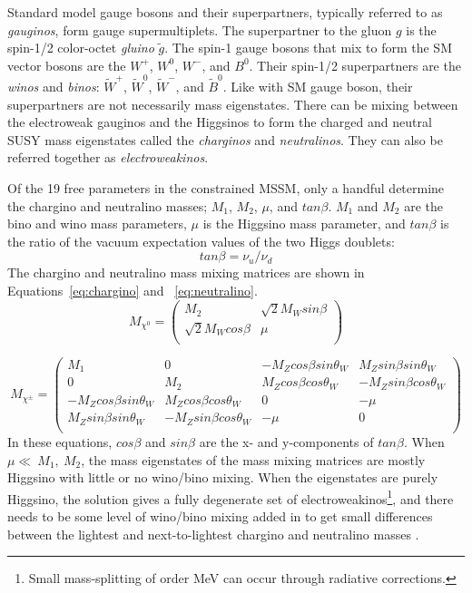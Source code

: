 Standard model gauge bosons and their superpartners, typically referred to as \textit{gauginos}, form gauge supermultiplets.  The superpartner to the gluon $g$ is the spin-1/2 color-octet \textit{gluino} $\tilde{g}$.  The spin-1 gauge bosons that mix to form the SM vector bosons are the $W^+$, $W^0$, $W^-$, and $B^0$.  Their spin-1/2 superpartners are the \textit{winos} and \textit{binos}: $\tilde{W}^+$, $\tilde{W}^0$, $\tilde{W}^-$, and $\tilde{B}^0$.  Like with SM gauge boson, their superpartners are not necessarily mass eigenstates.  There can be mixing between the electroweak gauginos and the Higgsinos to form the charged and neutral SUSY mass eigenstates called the \textit{charginos} and \textit{neutralinos}.  They can also be referred together as \textit{electroweakinos}. 

Of the 19 free parameters in the constrained MSSM, only a handful determine the chargino and neutralino masses; $M_1$, $M_2$, $\mu$, and $tan\beta$.  $M_1$ and $M_2$ are the bino and wino mass parameters, $\mu$ is the Higgsino mass parameter, and $tan\beta$ is the ratio of the vacuum expectation values of the two Higgs doublets:
\begin{equation}
tan\beta=\nu_u/\nu_d
\end{equation}
The chargino and neutralino mass mixing matrices are shown in Equations~\ref{eq:chargino} and ~\ref{eq:neutralino}.
\begin{equation}
M_{\chi^0}=
\begin{pmatrix}
M_2 & \sqrt{2}M_Wsin\beta \\
\sqrt{2}M_Wcos\beta & \mu \\
\end{pmatrix}
\label{eq:chargino}
\end{equation}

\begin{equation}
M_{\chi^\pm}=
\begin{pmatrix}
M_1 & 0 & -M_Zcos\beta sin\theta_W & M_Zsin\beta sin\theta_W\\
0 & M_2 & M_Zcos\beta cos\theta_W & -M_Zsin\beta cos\theta_W\\
-M_Zcos\beta sin\theta_W & M_Zcos\beta cos\theta_W & 0 & -\mu \\
M_Zsin\beta sin\theta_W & -M_Zsin\beta cos\theta_W & -\mu & 0 \\
\end{pmatrix}
\label{eq:neutralino}
\end{equation}
In these equations, $cos\beta$ and $sin\beta$ are the x- and y-components of $tan\beta$.  When $\mu\ll~M_1,~M_2$, the mass eigenstates of the mass mixing matrices are mostly Higgsino with little or no wino/bino mixing.  When the eigenstates are purely Higgsino, the solution gives a fully degenerate set of electroweakinos\footnote{Small mass-splitting of order MeV can occur through radiative corrections.}, and there needs to be some level of wino/bino mixing added in to get small differences between the lightest and next-to-lightest chargino and neutralino masses \cite{PhysRevD.93.063525}.


